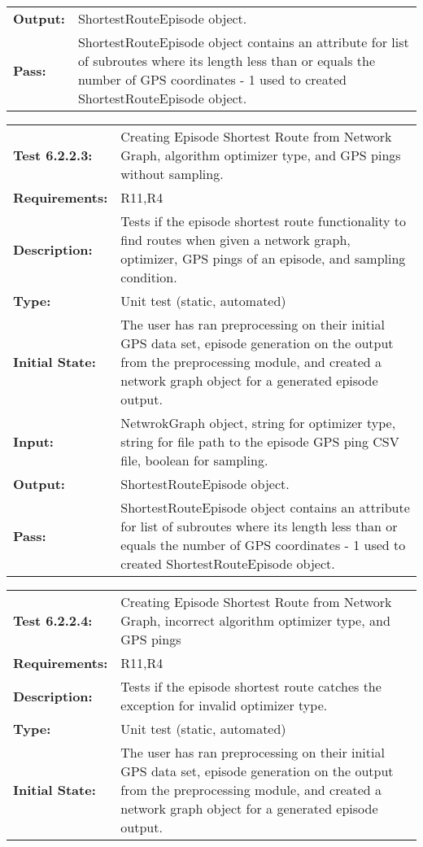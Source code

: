 \documentclass[12pt, titlepage]{article}
\begin{document}
{\begin{tabular}{|l|p{10cm}|}
    \bf{Output}: & ShortestRouteEpisode object. \\
    \bf{Pass}: & ShortestRouteEpisode object contains an attribute for list of subroutes where its length less than or equals the number of GPS coordinates - 1 used to created ShortestRouteEpisode object. \\
    \hline
\end{tabular}
\begin{tabular}{|l|p{10cm}|}
    \hline
    \bf{Test} 6.2.2.3: & Creating Episode Shortest Route from Network Graph, algorithm optimizer type, and GPS pings without sampling. \\
    \bf{Requirements}: & R11,R4 \\
    \bf{Description}: & Tests if the episode shortest route functionality to find routes when given a network graph, optimizer, GPS pings of an episode, and sampling condition. \\
    \bf{Type}: & Unit test (static, automated) \\
    \bf{Initial State}: & The user has ran preprocessing on their initial GPS data set, episode generation on the output from the preprocessing module, and created a network graph object for a generated episode output. \\
    \bf{Input}: & NetwrokGraph object, string for optimizer type, string for file path to the episode GPS ping CSV file, boolean for sampling. \\
    \bf{Output}: & ShortestRouteEpisode object. \\
    \bf{Pass}: & ShortestRouteEpisode object contains an attribute for list of subroutes where its length less than or equals the number of GPS coordinates - 1 used to created ShortestRouteEpisode object. \\
    \hline
\end{tabular}
\begin{tabular}{|l|p{10cm}|}
    \hline
    \bf{Test} 6.2.2.4: & Creating Episode Shortest Route from Network Graph, incorrect algorithm optimizer type, and GPS pings \\
    \bf{Requirements}: &  R11,R4\\
    \bf{Description}: & Tests if the episode shortest route catches the exception for invalid optimizer type. \\
    \bf{Type}: & Unit test (static, automated) \\
    \bf{Initial State}: & The user has ran preprocessing on their initial GPS data set, episode generation on the output from the preprocessing module, and created a network graph object for a generated episode output. \\

\end{tabular}}
\end{document}
